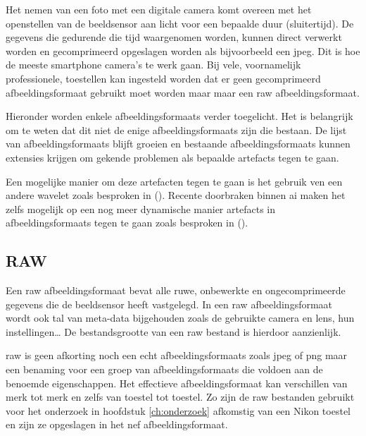 Het nemen van een foto met een digitale camera komt overeen met het openstellen van de beeldsensor aan licht voor een bepaalde duur (sluitertijd). De gegevens die gedurende die tijd waargenomen worden, kunnen direct verwerkt worden en gecomprimeerd opgeslagen worden als bijvoorbeeld een \gls{jpeg}. Dit is hoe de meeste smartphone camera’s te werk gaan. Bij vele, voornamelijk professionele, toestellen kan ingesteld worden dat er geen gecomprimeerd \gls{afbeeldingsformaat} gebruikt moet worden maar maar een \gls{raw} \gls{afbeeldingsformaat}. 

Hieronder worden enkele \glspl{afbeeldingsformaat} verder toegelicht. Het is belangrijk om te weten dat dit niet de enige \glspl{afbeeldingsformaat} zijn die bestaan. De lijst van \glspl{afbeeldingsformaat} blijft groeien en bestaande \glspl{afbeeldingsformaat} kunnen extensies krijgen om gekende problemen als bepaalde \glspl{artefact} tegen te gaan. 

Een mogelijke manier om deze artefacten tegen te gaan is het gebruik ven een andere \gls{wavelet} zoals besproken in  (\cite{inproceedings}). Recente doorbraken binnen \gls{ai} maken het zelfs mogelijk op een nog meer dynamische manier \glspl{artefact} in \glspl{afbeeldingsformaat} tegen te gaan zoals besproken in  (\cite{jpegartefactereductionai}).


\subsection{RAW}
\label{sec:afbeeldingscompressie-raw}

Een \gls{raw} \gls{afbeeldingsformaat} bevat alle ruwe, onbewerkte en ongecomprimeerde gegevens die de beeldsensor heeft vastgelegd. In een \gls{raw} \gls{afbeeldingsformaat} wordt ook tal van \gls{meta-data}  bijgehouden zoals de gebruikte camera en lens, hun instellingen… De bestandsgrootte van een \gls{raw} bestand is hierdoor aanzienlijk. 

\Gls{raw} is geen afkorting noch een echt \glspl{afbeeldingsformaat} zoals \gls{jpeg} of \gls{png} maar een benaming voor een groep van \glspl{afbeeldingsformaat} die voldoen aan de benoemde eigenschappen. Het effectieve \gls{afbeeldingsformaat} kan verschillen van merk tot merk en zelfs van toestel tot toestel. Zo zijn de \gls{raw} bestanden gebruikt voor het onderzoek in hoofdstuk \ref{ch:onderzoek} afkomstig van een Nikon toestel en zijn ze opgeslagen in het \gls{nef} \gls{afbeeldingsformaat}.


